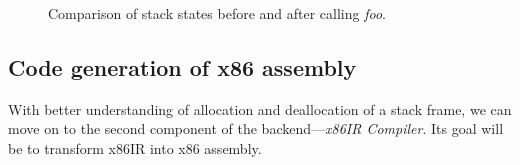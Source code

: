 \documentclass[thesis=M,english]{FITthesis}[2019/12/23]
\begin{document}
\begin{figure}
	\centering
	\hspace{1em}
	\caption{Comparison of stack states before and after calling \emph{foo}.}
	\label{fig:stack_state}
\end{figure}

\subsection{Code generation of x86 assembly}\label{ssec:x86_code_gen}
With better understanding of allocation and deallocation of a stack frame, we can move on to the second component of the backend---\emph{x86IR Compiler}. Its goal will be to transform x86IR into x86 assembly. 
\end{document}
